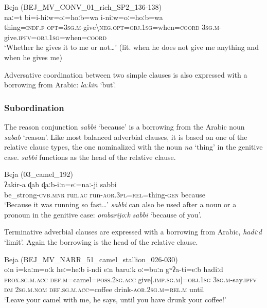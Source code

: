 \documentclass[output=paper]{langsci/langscibook}
\begin{document}
\ea\label{thing}
{{Beja (}BEJ\_MV\_CONV\_01\_rich\_SP2\_136-138)}\\
\gll naː=t bi=i-hiːw=oː=hoːb=wa i-niːw=oː=hoːb=wa\\
     thing=\textsc{indf.f} \textsc{opt=3sg.m-}give\textsc{\textbackslash neg.opt=obj.1sg}=when=\textsc{coord} \textsc{3sg.m-}give.\textsc{ipfv=obj.1sg}=when=\textsc{coord}\\
\glt `Whether he gives it to me or not…' (lit. when he does not give me anything and when he gives me)
\z

Adversative coordination between two simple clauses is also expressed with a borrowing from Arabic: \textit{laːkin} ‘but’.


 \subsubsection{Subordination}

The reason conjunction \textit{sabbi} ‘because’ is a borrowing from the Arabic noun \textit{sabab} ‘reason’. Like most balanced adverbial clauses, it is based on one of the relative clause types, the one nominalized with the noun \textit{na} ‘thing’ in the genitive case. \textit{sabbi} functions as the head of the relative clause.

\ea
{Beja ({03\_camel\_192)}}\\
\gll ʔakir-a ɖab ɖaːb-iːn=eː=naː-ji sabbi\\
     be\_strong-\textsc{cvb.mnr} run.\textsc{ac} run-\textsc{aor.3pl=rel}=thing-\textsc{gen} because\\
\glt `Because it was running so fast…'
\z
\textit{sabbi} can also be used after a noun or a pronoun in the genitive case: \textit{ombarijoːk} \textit{sabbi} ‘because of you’.

Terminative adverbial clauses are expressed with a borrowing from Arabic, \textit{hadiːd} ‘limit’. Again the borrowing is the head of the relative clause.

\ea\label{ex:vanhove:}
{Beja (BEJ\_MV\_NARR\_51\_camel\_stallion\_026-030)}\\
\gll oːn i=kaːm=oːk heː=heːb i-ndi eːn baruːk oː=buːn gʷʔa-ti=eːb hadiːd\\
     \textsc{prox.sg.m.acc} \textsc{def.m}=camel=\textsc{poss.2sg.acc} give[.\textsc{imp.sg.m]=obj.1sg} \textsc{3sg.m}{}-say.\textsc{ipfv} \textsc{dm} \textsc{2sg.m.nom} \textsc{def.sg.m.acc}=coffee drink-\textsc{aor.2sg.m=rel.m} until\\
\glt `Leave your camel with me, he says, until you have drunk your coffee!'
\z
\end{document}
